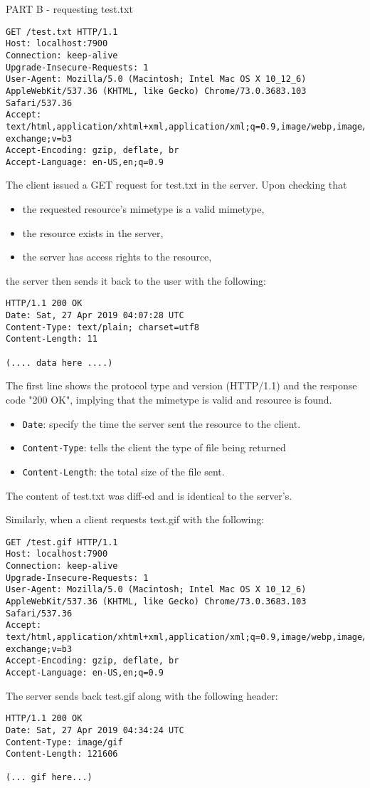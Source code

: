 \documentclass[11pt]{article}
\begin{document}
PART B - requesting test.txt
\begin{verbatim}
GET /test.txt HTTP/1.1
Host: localhost:7900
Connection: keep-alive
Upgrade-Insecure-Requests: 1
User-Agent: Mozilla/5.0 (Macintosh; Intel Mac OS X 10_12_6) AppleWebKit/537.36 (KHTML, like Gecko) Chrome/73.0.3683.103 Safari/537.36
Accept: text/html,application/xhtml+xml,application/xml;q=0.9,image/webp,image/apng,*/*;q=0.8,application/signed-exchange;v=b3
Accept-Encoding: gzip, deflate, br
Accept-Language: en-US,en;q=0.9
\end{verbatim}
The client issued a GET request for test.txt in the server. Upon checking that 
\begin{itemize}
    \item the requested resource's mimetype is a valid mimetype,
    \item the resource exists in the server, 
    \item the server has access rights to the resource, 
\end{itemize}

the server then sends it back to the user with the following:

\begin{verbatim}
HTTP/1.1 200 OK
Date: Sat, 27 Apr 2019 04:07:28 UTC
Content-Type: text/plain; charset=utf8
Content-Length: 11

(.... data here ....)
\end{verbatim}

The first line shows the protocol type and version (HTTP/1.1) and the response code "200 OK", implying that the mimetype is valid and resource is found.
\begin{itemize}
  \item \texttt{Date}: specify the time the server sent the resource to the client.
  \item \texttt{Content-Type}: tells the client the type of file being returned
  \item \texttt{Content-Length}: the total size of the file sent.
\end{itemize}

The content of test.txt was diff-ed and is identical to the server's.

Similarly, when a client requests test.gif with the following:
\begin{verbatim}
GET /test.gif HTTP/1.1
Host: localhost:7900
Connection: keep-alive
Upgrade-Insecure-Requests: 1
User-Agent: Mozilla/5.0 (Macintosh; Intel Mac OS X 10_12_6) AppleWebKit/537.36 (KHTML, like Gecko) Chrome/73.0.3683.103 Safari/537.36
Accept: text/html,application/xhtml+xml,application/xml;q=0.9,image/webp,image/apng,*/*;q=0.8,application/signed-exchange;v=b3
Accept-Encoding: gzip, deflate, br
Accept-Language: en-US,en;q=0.9
\end{verbatim}

The server sends back test.gif along with the following header:
\begin{verbatim}
HTTP/1.1 200 OK
Date: Sat, 27 Apr 2019 04:34:24 UTC
Content-Type: image/gif
Content-Length: 121606

(... gif here...)
\end{verbatim}
\end{document}
